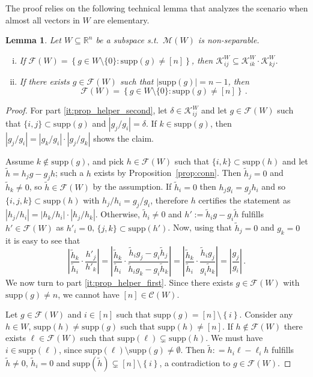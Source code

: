 \documentclass[11pt, a4paper]{article}
\newcommand{\circuits}{\mathcal{C}}
\newcommand{\supp}{\mathrm{supp}}
\newcommand{\1}{\mathbbm{1}}
\newcommand{\set}[1]{\left\{ #1 \right\}}
\newcommand{\KK}{\mathcal K}
\newcommand{\EE}{\mathcal F}
\newtheorem{lemma}[theorem]{Lemma}
\theoremstyle{case}
\newcommand{\R}{\mathbb{R}}
\begin{document}
The proof relies on the following technical lemma that analyzes the scenario when almost all vectors in $W$ are elementary.
\begin{lemma}
  \label{lem:helper_triangle}
   Let $W \subseteq \R^n$ be a subspace s.t.\ $\mathcal{M}(W)$ is non-separable. 
  \begin{enumerate}[(i)]
  \item \label{it:prop_helper_second} If $\EE(W) = \set{g \in W\setminus\{0\} : \supp(g)\neq [n]}$, then $\KK_{ij}^W \subseteq \KK_{ik}^W\cdot \KK_{kj}^W$. 
    \item \label{it:prop_helper_first} If there exists $g \in \EE(W)$ such that $|\supp(g)| = n - 1$, then 
$$\EE(W) = \set{g \in W\setminus\{0\} : \supp(g)\neq [n]}\, .$$
\end{enumerate}
\end{lemma}
\begin{proof}
  For part \ref{it:prop_helper_second}, 
let $\delta \in \KK_{ij}^W$ and let $g \in \EE(W)$ such that $\{i,j\} \subset \supp(g)$ and $|g_j/g_i| = \delta$. If $k \in \supp(g)$, then $|g_j/g_i| = |g_k/g_i| \cdot |g_j/g_k|$ shows the claim.

Assume $k\notin \supp(g)$, and pick $h \in \EE(W)$ such that $\{i,k\} \subset \supp(h)$ and let $\tilde h = h_jg - g_jh$; such a $h$ exists by Proposition~\ref{prop:conn}. Then $\tilde h_j = 0$ and $\tilde h_k \neq 0$, so $\tilde h \in \EE(W)$ by the assumption. If $\tilde h_i = 0$ then $h_jg_i = g_jh_i$ and so $\{i,j,k\} \subset \supp(h)$ with $h_j/h_i = g_j/g_i$, therefore $h$ certifies the statement as $|h_j/h_i| = |h_k/h_i| \cdot |h_j/h_k|$.
Otherwise, $\tilde h_i \neq 0$ and $h':= \tilde h_ig - g_i\tilde h$ fulfills $h' \in \EE(W)$ as $h'_i = 0$, $\{j, k\} \subset \supp(h')$.
Now, using that $\tilde h_j = 0$ and $g_k = 0$ it is easy to see that
\begin{equation}
  \left|\frac{\tilde h_k}{\tilde h_i}\cdot \frac{h'_j}{h'_k} \right|
  = \left| \frac{\tilde h_k}{\tilde h_i}\cdot \frac{\tilde h_i g_j - g_i \tilde h_j}{\tilde h_i g_k - g_i\tilde h_k} \right|
  =  \left| \frac{\tilde h_k}{\tilde h_i}\cdot \frac{\tilde h_i g_j}{g_i\tilde h_k} \right|
   = \left| \frac{g_j}{g_i} \right| \, .
\end{equation}
We now turn to part \ref{it:prop_helper_first}. Since there exists $g \in \EE(W)$ with $\supp(g) \neq n$, we cannot have $[n] \in \circuits(W)$. 

Let $g \in \EE(W)$ and $i \in [n]$ such that $\supp(g) = [n] \setminus \set{i}$. Consider any $h \in W$, $\supp(h) \neq \supp(g)$ such that $\supp(h) \neq [n]$. If $h \notin \EE(W)$ there exists $\ell \in \EE(W)$ such that $\supp(\ell) \subsetneq \supp(h)$. We must have $i \in \supp(\ell)$, since $\supp(\ell)\setminus \supp(g)\neq \emptyset$. Then $\tilde h: = h_i\ell - \ell_ih$ fulfills $\tilde h\neq 0$, $\tilde h_i = 0$ and $\supp(\tilde h) \subsetneq [n]\setminus \set{i}$, a contradiction to $g \in \EE(W)$.
\end{proof}
\end{document}
